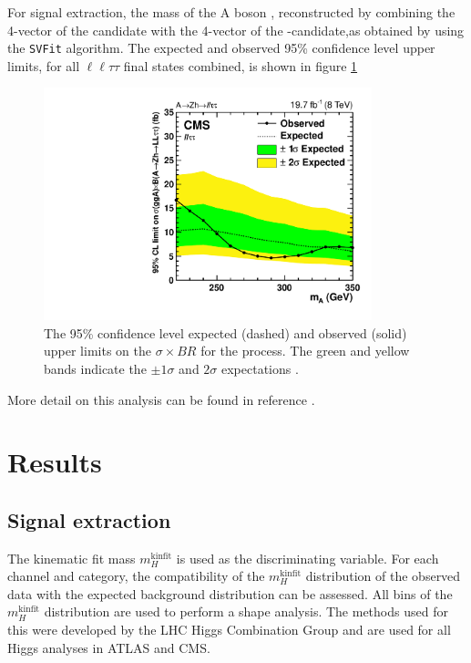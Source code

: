 For signal extraction, the mass of the A boson \mA, reconstructed by combining the
4-vector of the \PZ candidate with the 4-vector of the \Ph -candidate,as obtained by using the 
\texttt{SVFit} algorithm. The expected and observed 95\% confidence level upper limits, for
all $\ell\ell\tau\tau$ final states combined, is shown in figure \ref{fig:AZhUpperLimits}

\begin{figure}[h!]
\begin{center}
\includegraphics[width=0.85\textwidth]{Hhh/Plots/CMS-HIG-14-034_Figure_010-a.pdf}
\caption{The 95\% confidence level expected (dashed) and observed (solid)
upper limits on the $\sigma \times BR$ for the \AtoZhtolltautau process.
The green and yellow bands indicate the $\pm 1 \sigma $ and $2\sigma$
expectations \cite{CMS-HIG-14-034}.}
\label{fig:AZhUpperLimits}
\end{center}
\end{figure}



More detail on this analysis can be found in reference \cite{CMS-HIG-14-034}.




\section{Results}
\label{sec:hhh_results}

\subsection{Signal extraction}
\label{sec:hhh_results_extraction}
The kinematic fit mass $m_{H}^{\text{kinfit}}$ is used as the discriminating variable.
For each channel and category, the compatibility of the $m_{H}^{\text{kinfit}}$ distribution
of the observed data with the expected background distribution can be assessed. All bins
of the $m_{H}^{\text{kinfit}}$ distribution are used to perform a shape analysis. The 
methods used for this were developed by the LHC Higgs Combination Group \cite{LHCHComb2011} 
and are used for all Higgs analyses in ATLAS and CMS. 

